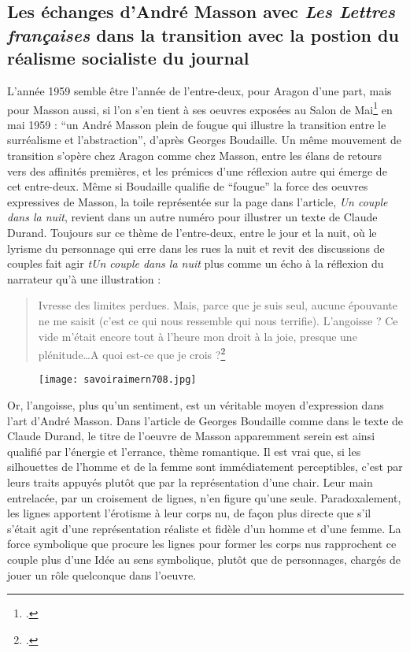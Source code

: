 \subsection{Les échanges d'André Masson avec \emph{Les Lettres françaises }dans la transition avec la postion du réalisme socialiste du journal}

L’année 1959 semble être l’année de l’entre-deux, pour Aragon d’une part, mais pour Masson aussi, si l’on s’en tient à ses oeuvres exposées au Salon de Mai\footcite{salondemai} en mai 1959 : \enquote{un André Masson plein de fougue qui illustre la transition entre le surréalisme et l’abstraction}, d’après Georges Boudaille. Un même mouvement de transition s’opère chez Aragon comme chez Masson, entre les élans de retours vers des affinités premières, et les prémices d’une réflexion autre qui émerge de cet entre-deux. Même si Boudaille qualifie de \enquote{fougue} la force des oeuvres expressives de Masson, la toile représentée sur la page dans l’article, \emph{Un couple dans la nuit}, revient dans un autre numéro pour illustrer un texte de Claude Durand. Toujours sur ce thème de l’entre-deux, entre le jour et la nuit, où le lyrisme du personnage qui erre dans les rues la nuit et revit des discussions de couples fait agir \emph{tUn couple dans la nuit} plus comme un écho à la réflexion du narrateur qu’à une illustration : 


\begin{quote}
Ivresse des limites perdues. Mais, parce que je suis seul, aucune épouvante ne me saisit (c’est ce qui nous ressemble qui nous terrifie). L’angoisse ? Ce vide m’était encore tout à l’heure mon droit à la joie, presque une plénitude…A quoi est-ce que je crois ?\footcite{} 	
\end{quote}

\begin{figure}[H]
   \centering
   \texttt{[image: savoiraimern708.jpg]}
	\caption{\cite{savoiraimer}}\label{fig:Savoiraimer}
\end{figure}

 Or, l’angoisse, plus qu’un sentiment, est un véritable moyen d’expression dans l’art d’André Masson. Dans l’article de Georges Boudaille comme dans le texte de Claude Durand, le titre de l’oeuvre de Masson apparemment serein est ainsi qualifié par l’énergie et l’errance, thème romantique. Il est vrai que, si les silhouettes de l’homme et de la femme sont immédiatement perceptibles, c’est par leurs traits appuyés plutôt que par la représentation d’une chair. Leur main entrelacée, par un croisement de lignes, n’en figure qu’une seule. Paradoxalement, les lignes apportent l’érotisme à leur corps nu, de façon plus directe que s’il s’était agit d’une représentation réaliste et fidèle d’un homme et d’une femme. La force symbolique que procure les lignes pour former les corps nus rapprochent ce couple plus d’une Idée au sens symbolique, plutôt que de personnages, chargés de jouer un rôle quelconque dans l’oeuvre.  



